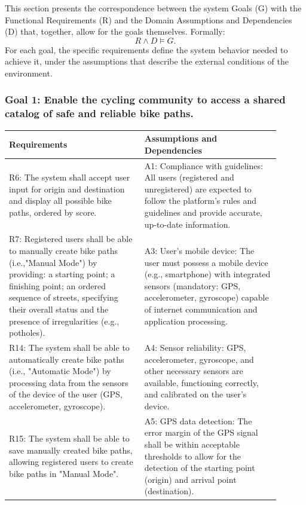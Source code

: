 \documentclass{Configuration_Files/PoliMi3i_thesis}
\begin{document}
    This section presents the correspondence between the system Goals (G) with the Functional Requirements (R) and the Domain Assumptions and Dependencies (D) that, together, allow for the goals themselves. 
    Formally:
    \[
    R \land D \models G .
    \]
    For each goal, the specific requirements define the system behavior needed to achieve it, under the assumptions that describe the external conditions of the environment.

    \subsubsection*{Goal 1: Enable the cycling community to access a shared catalog of safe and reliable bike paths.}
    \begin{longtable}{|p{0.45\linewidth}|p{0.45\linewidth}|}
    \hline
    \textbf{Requirements} & \textbf{Assumptions and Dependencies} \\ \hline
    R6: The system shall accept user input for origin and destination and display all possible bike paths, ordered by score.&A1: Compliance with guidelines: All users (registered and unregistered) are expected to follow the platform’s rules and guidelines and provide accurate, up-to-date information.\\
    R7: Registered users shall be able to manually create bike paths (i.e.,"Manual Mode") by providing: a starting point; a finishing point; an ordered sequence of streets, specifying their overall status and the presence of irregularities (e.g., potholes).&A3: User’s mobile device: The user must possess a mobile device (e.g., smartphone) with integrated sensors (mandatory: GPS, accelerometer, gyroscope) capable of internet communication and application processing.\\
    R14: The system shall be able to automatically create bike paths (i.e., "Automatic Mode") by processing data from the sensors of the device of the user (GPS, accelerometer, gyroscope).&A4: Sensor reliability: GPS, accelerometer, gyroscope, and other necessary sensors are available, functioning correctly, and calibrated on the user's device.\\
    R15: The system shall be able to save manually created bike paths, allowing registered users to create bike paths in "Manual Mode".&A5: GPS data detection: The error margin of the GPS signal shall be within acceptable thresholds to allow for the detection of the starting point (origin) and arrival point (destination).\\

\end{longtable}
\end{document}

